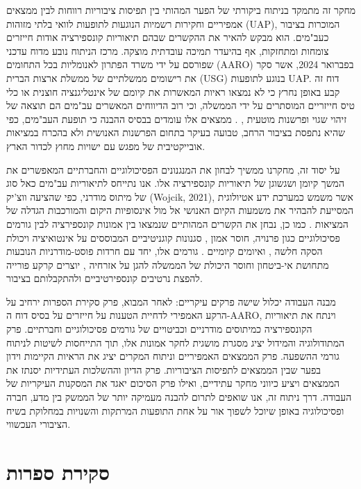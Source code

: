\documentclass[12pt,a4paper]{article}
\begin{document}
מחקר זה מתמקד בניתוח ביקורתי של הפער המהותי בין תפיסות ציבוריות רווחות לבין ממצאים אמפיריים וחקירות רשמיות הנוגעות לתופעות לוואי בלתי מזוהות (UAP), המוכרות בציבור כעב"מים. הוא מבקש להאיר את ההקשרים שבהם תיאוריות קונספירציה אודות חייזרים צומחות ומתחזקות, אף בהיעדר תמיכה עובדתית מוצקה. מרכז הניתוח נובע מדוח עדכני שפורסם על ידי משרד הפתרון לאנומליות בכל התחומים (AARO) בפברואר 2024, אשר סקר את רישומים ממשלתיים של ממשלת ארצות הברית (USG) בנוגע לתופעות UAP. דוח זה קבע באופן נחרץ כי לא נמצאו ראיות המאשרות את קיומם של אינטליגנציה חוצנית או כלי טיס חייזריים המוסתרים על ידי הממשלה, וכי רוב הדיווחים המאשרים עב"מים הם תוצאה של זיהוי שגוי ופרשנות מוטעית \cite{aaro2024misidentification}, \cite{aaro2024noevidence}. ממצאים אלו עומדים בבסיס ההבנה כי תופעת העב"מים, כפי שהיא נתפסת בציבור הרחב, טבועה בעיקר בתחום הפרשנות האנושית ולא בהכרח במציאות אובייקטיבית של מפגש עם ישויות מחוץ לכדור הארץ.

על יסוד זה, מחקרנו ממשיך לבחון את המנגנונים הפסיכולוגיים והחברתיים המאפשרים את המשך קיומן ושגשוגן של תיאוריות קונספירציה אלו. אנו נתייחס לתיאוריות עב"מים כאל סוג של מיתוס מודרני, כפי שהציעה ווצ'יק (Wojcik, 2021), אשר משמש כמערכת ידע אטיולוגית המסייעת להבהיר את משמעות הקיום האנושי אל מול אינסופיות היקום והמורכבות הגדלה של המציאות \cite{wojcik2021cosmologies}. כמו כן, נבחן את הקשרים המהותיים שנמצאו בין אמונות קונספירציה לבין גורמים פסיכולוגיים כגון פרנויה, חוסר אמון \cite{bowes2023conspiracy}, סגנונות קוגניטיביים המבוססים על אינטואיציה ויכולת הסקה חלשה \cite{biddlestone2025conspiracy}, ואיומים קיומיים \cite{biddlestone2025conspiracy}. גורמים אלו, יחד עם חרדות פוסט-מודרניות הנובעות מתחושת אי-ביטחון וחוסר היכולת של הממשלה להגן על אזרחיה \cite{ellwood1999ufo}, יוצרים קרקע פורייה להפצת נרטיבים קונספירטיביים ולהתקבלותם בציבור.

מבנה העבודה יכלול שישה פרקים עיקריים: לאחר המבוא, פרק סקירת הספרות ירחיב על הרקע האמפירי לדחיית הטענות על חייזרים על בסיס דוח ה-AARO, וינתח את תיאוריות הקונספירציה כמיתוסים מודרניים וכביטויים של גורמים פסיכולוגיים וחברתיים. פרק המתודולוגיה והמידול יציג מסגרת מושגית לחקר אמונות אלו, תוך התייחסות לשיטות לניתוח גורמי ההשפעה. פרק הממצאים האמפיריים וניתוח המקרים יציג את הראיות הקיימות וידון בפער שבין הממצאים לתפיסות הציבוריות. פרק הדיון וההשלכות העתידיות יסנתז את הממצאים ויציע כיווני מחקר עתידיים, ואילו פרק הסיכום יאגד את המסקנות העיקריות של העבודה. דרך ניתוח זה, אנו שואפים לתרום להבנה מעמיקה יותר של הממשק בין מדע, חברה ופסיכולוגיה באופן שיוכל לשפוך אור על אחת התופעות המרתקות והשנויות במחלוקת בשיח הציבורי העכשווי.

\section{סקירת ספרות}
\end{document}

